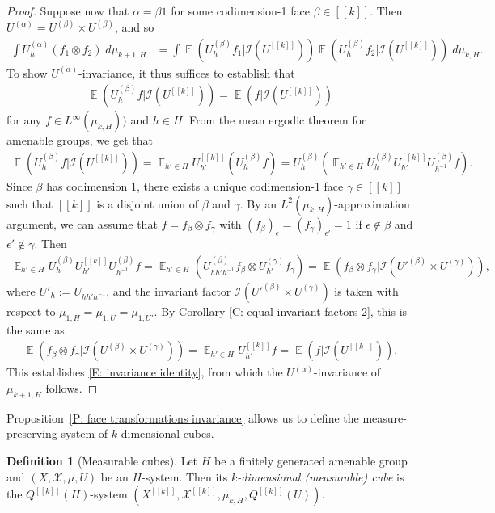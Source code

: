 \documentclass[11pt]{amsart}
\theoremstyle{definition}
\newtheorem{definition}[lemma]{Definition}
\DeclareMathOperator*{\E}{\mathbb{E}}
\newcommand{\CI}{{\mathcal I}}
\newcommand{\CX}{{\mathcal X}}
\newcommand{\eps}{\epsilon}
\newcommand{\cube}[1]{{[\![#1]\!]}}
\newcommand{\inv}{^{-1}}
\newcommand{\1}{{\mathbf{1}}}
\newcommand{\brac}[1]{\mathopen{}\left( #1 \mathclose{}\right)}
\begin{document}
\begin{proof}
    Suppose now that $\alpha = \beta1$ for some codimension-1 face $\beta\in\cube{k}$. Then $U^{(\alpha)} = U^{(\beta)}\times U^{(\beta)}$, and so
    \begin{align*}
        \int U_h^{(\alpha)}(f_1 \otimes f_2)\; d\mu_{k+1,H} &= \int \E(U_h^{(\beta)}f_1|\CI(U^\cube{k}))\E(U_h^{(\beta)}f_2|\CI(U^\cube{k}))\;d\mu_{k,H}.
    \end{align*}
    To show $U^{(\alpha)}$-invariance, it thus suffices to establish that 
    \begin{align}\label{E: invariance identity}
        \E(U_h^{(\beta)}f|\CI(U^\cube{k})) =\E(f|\CI(U^\cube{k}))
    \end{align}
    for any $f\in L^\infty(\mu_{k,H}))$ and $h\in H$. From the mean ergodic theorem for amenable groups, we get that
    \begin{align*}
        \E(U_h^{(\beta)}f|\CI(U^\cube{k})) = \E_{h'\in H}U^\cube{k}_{h'}(U^{(\beta)}_h f) = U_h^{(\beta)}\brac{\E_{h'\in H} U_h^{(\beta)}U_{h'}^\cube{k}U_{h\inv}^{(\beta)}f}.
    \end{align*}
    Since $\beta$ has codimension 1, there exists a unique codimension-1 face $\gamma\in \cube{k}$ such that $\cube{k}$ is a disjoint union of $\beta$ and $\gamma$. By an $L^2(\mu_{k,H})$-approximation argument, we can assume that $f = f_\beta \otimes f_\gamma$ with $(f_\beta)_\eps = (f_\gamma)_{\eps'} = 1$ if $\eps\notin\beta$ and $\eps'\notin\gamma$. Then
    \begin{align*}
        \E_{h'\in H} U_h^{(\beta)}U_{h'}^\cube{k}U_{h\inv}^{(\beta)}f = \E_{h'\in H}(U_{hh'h\inv}^{(\beta)}f_\beta \otimes U_{h'}^{(\gamma)}f_\gamma) = \E(f_\beta\otimes f_\gamma|\CI(U'^{(\beta)} \times U^{(\gamma)})),
    \end{align*}
    where $U'_h := U_{hh'h\inv}$, {and the invariant factor $\CI(U'^{(\beta)} \times U^{(\gamma)})$ is taken with respect to $\mu_{1,H} = \mu_{1,U} =\mu_{1,U'}$.}
    By Corollary \ref{C: equal invariant factors 2}, this is the same as 
    \begin{align*}
        \E(f_\beta\otimes f_\gamma|\CI(U^{(\beta)} \times U^{(\gamma)})) = \E_{h'\in H} U_{h'}^\cube{k}f =  \E(f|\CI(U^\cube{k})).
    \end{align*}
    This establishes \eqref{E: invariance identity}, from which the $U^{(\alpha)}$-invariance of $\mu_{k+1,H}$ follows.
\end{proof}

Proposition~\ref{P: face transformations invariance} allows us to define the measure-preserving system of $k$-dimensional cubes. 
\begin{definition}[Measurable cubes]
    Let $H$ be a  finitely generated amenable group and $(X, \CX, \mu, U)$ be an $H$-system. Then its \textit{$k$-dimensional (measurable) cube} is the $Q^\cube{k}(H)$-system $(X^\cube{k}, \CX^\cube{k}, \mu_{k,H}, Q^\cube{k}(U))$.
\end{definition}
\end{document}
